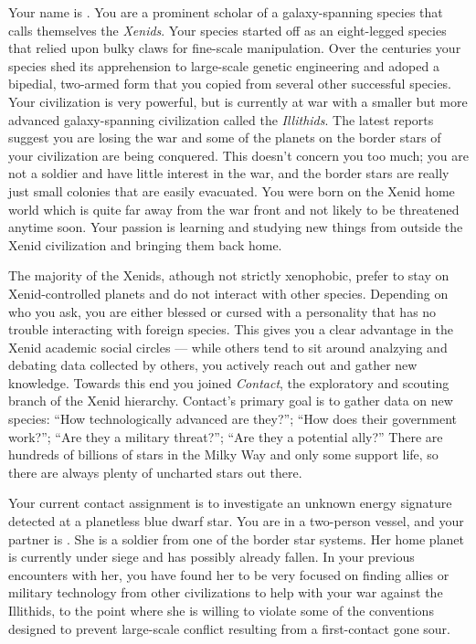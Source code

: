 \documentclass[char]{guildcamp1}
\begin{document}
\name{\cPassive{}}

Your name is \cPassive{\they}. You are a prominent scholar of a galaxy-spanning species that calls themselves the \emph{Xenids}. Your species started off as an eight-legged species that relied upon bulky claws for fine-scale manipulation. Over the centuries your species shed its apprehension to large-scale genetic engineering and adoped a bipedial, two-armed form that you copied from several other successful species. Your civilization is very powerful, but is currently at war with a smaller but more advanced galaxy-spanning civilization called the \emph{Illithids}. The latest reports suggest you are losing the war and some of the planets on the border stars of your civilization are being conquered. This doesn't concern you too much; you are not a soldier and have little interest in the war, and the border stars are really just small colonies that are easily evacuated. You were born on the Xenid home world which is quite far away from the war front and not likely to be threatened anytime soon. Your passion is learning and studying new things from outside the Xenid civilization and bringing them back home.

The majority of the Xenids, athough not strictly xenophobic, prefer to stay on Xenid-controlled planets and do not interact with other species. Depending on who you ask, you are either blessed or cursed with a personality that has no trouble interacting with foreign species. This gives you a clear advantage in the Xenid academic social circles --- while others tend to sit around analzying and debating data collected by others, you actively reach out and gather new knowledge. Towards this end you joined \emph{Contact}, the exploratory and scouting branch of the Xenid hierarchy. Contact's primary goal is to gather data on new species: ``How technologically advanced are they?''; ``How does their government work?''; ``Are they a military threat?''; ``Are they a potential ally?'' There are hundreds of billions of stars in the Milky Way and only some support life, so there are always plenty of uncharted stars out there.

Your current contact assignment is to investigate an unknown energy signature detected at a planetless blue dwarf star. You are in a two-person vessel, and your partner is \cActive{\they}. She is a soldier from one of the border star systems. Her home planet is currently under siege and has possibly already fallen. In your previous encounters with her, you have found her to be very focused on finding allies or military technology from other civilizations to help with your war against the Illithids, to the point where she is willing to violate some of the conventions designed to prevent large-scale conflict resulting from a first-contact gone sour.
\end{document}
